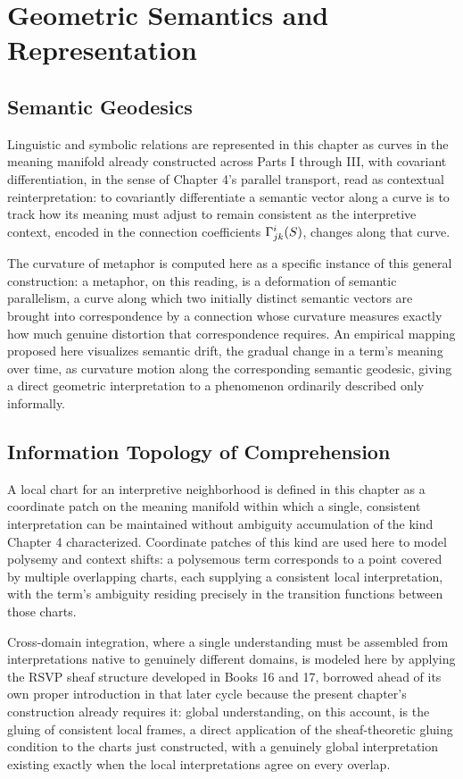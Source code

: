 \part{Geometric Semantics and Representation}

\chapter{Semantic Geodesics}

Linguistic and symbolic relations are represented in this chapter as curves in the meaning manifold already constructed across Parts I through III, with covariant differentiation, in the sense of Chapter 4's parallel transport, read as contextual reinterpretation: to covariantly differentiate a semantic vector along a curve is to track how its meaning must adjust to remain consistent as the interpretive context, encoded in the connection coefficients $\Gamma^i_{jk}(S)$, changes along that curve.

The curvature of metaphor is computed here as a specific instance of this general construction: a metaphor, on this reading, is a deformation of semantic parallelism, a curve along which two initially distinct semantic vectors are brought into correspondence by a connection whose curvature measures exactly how much genuine distortion that correspondence requires. An empirical mapping proposed here visualizes semantic drift, the gradual change in a term's meaning over time, as curvature motion along the corresponding semantic geodesic, giving a direct geometric interpretation to a phenomenon ordinarily described only informally.

\chapter{Information Topology of Comprehension}

A local chart for an interpretive neighborhood is defined in this chapter as a coordinate patch on the meaning manifold within which a single, consistent interpretation can be maintained without ambiguity accumulation of the kind Chapter 4 characterized. Coordinate patches of this kind are used here to model polysemy and context shifts: a polysemous term corresponds to a point covered by multiple overlapping charts, each supplying a consistent local interpretation, with the term's ambiguity residing precisely in the transition functions between those charts.

Cross-domain integration, where a single understanding must be assembled from interpretations native to genuinely different domains, is modeled here by applying the RSVP sheaf structure developed in Books 16 and 17, borrowed ahead of its own proper introduction in that later cycle because the present chapter's construction already requires it: global understanding, on this account, is the gluing of consistent local frames, a direct application of the sheaf-theoretic gluing condition to the charts just constructed, with a genuinely global interpretation existing exactly when the local interpretations agree on every overlap.

